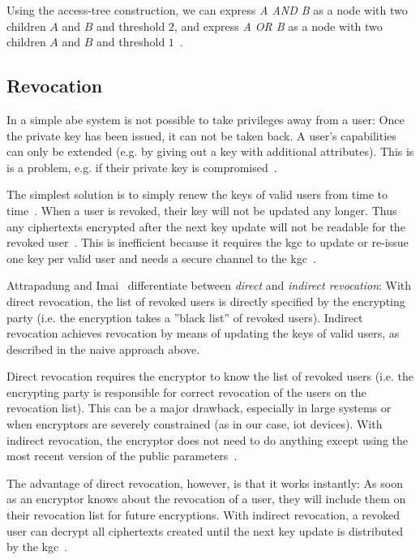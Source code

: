 Using the \gls{access-tree} construction, we can express \emph{A AND B} as a node with two children $A$ and $B$ and threshold $2$, and express \emph{A OR B} as a node with two children $A$ and $B$ and threshold $1$~\cite{yao_lightweight_2015}.

\subsection{Revocation}
In a simple \acrshort{abe} system is not possible to take privileges away from a user:
Once the private key has been issued, it can not be taken back.
A user's capabilities can only be extended (e.g. by giving out a key with additional attributes).
This is is a problem, e.g. if their private key is compromised~\cite{boldyreva_identity-based_2008}.

The simplest solution is to simply renew the keys of valid users from time to time~\cite{boldyreva_identity-based_2008}.
When a user is revoked, their key will not be updated any longer. Thus any ciphertexts encrypted after the next key update will not be readable for the revoked user~\cite{boldyreva_identity-based_2008}.
This is inefficient because it requires the \acrshort{kgc} to update or re-issue one key per valid user and needs a secure channel to the \acrshort{kgc}~\cite{boldyreva_identity-based_2008}.

Attrapadung and Imai~\cite{attrapadung_attribute-based_2009} differentiate between \emph{direct} and \emph{indirect revocation}: 
With direct revocation, the list of revoked users is directly specified by the encrypting party (i.e. the encryption takes a ''black list'' of revoked users).
Indirect revocation achieves revocation by means of updating the keys of valid users, as described in the naive approach above.

Direct revocation requires the encryptor to know the list of revoked users \cite{attrapadung_attribute-based_2009} (i.e. the encrypting party is responsible for correct revocation of the users on the revocation list).
This can be a major drawback, especially in large systems or when encryptors are severely constrained (as in our case, \acrshort{iot} devices).
With indirect revocation, the encryptor does not need to do anything except using the most recent version of the public parameters~\cite{attrapadung_attribute-based_2009}.

The advantage of direct revocation, however, is that it works instantly: As soon as an encryptor knows about the revocation of a user, they will include them on their revocation list for future encryptions.
With indirect revocation, a revoked user can decrypt all ciphertexts created until the next key update is distributed by the \acrshort{kgc}~\cite{attrapadung_attribute-based_2009}.

